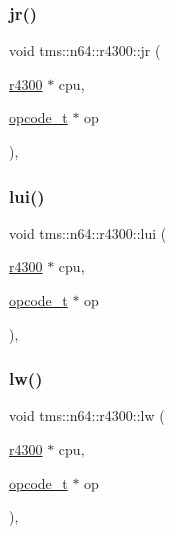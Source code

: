 \subsubsection{\texorpdfstring{jr()}{jr()}}
{\footnotesize\ttfamily void tms\+::n64\+::r4300\+::jr (\begin{DoxyParamCaption}\item[{\hyperlink{classtms_1_1n64_1_1r4300}{r4300} $\ast$}]{cpu,  }\item[{\hyperlink{classtms_1_1n64_1_1opcode__t}{opcode\+\_\+t} $\ast$}]{op }\end{DoxyParamCaption})\hspace{0.3cm}{\ttfamily [static]}, {\ttfamily [private]}}

\mbox{\label{classtms_1_1n64_1_1r4300_aabb49fbdff80873de9b192d0c9034bb0}} 
\subsubsection{\texorpdfstring{lui()}{lui()}}
{\footnotesize\ttfamily void tms\+::n64\+::r4300\+::lui (\begin{DoxyParamCaption}\item[{\hyperlink{classtms_1_1n64_1_1r4300}{r4300} $\ast$}]{cpu,  }\item[{\hyperlink{classtms_1_1n64_1_1opcode__t}{opcode\+\_\+t} $\ast$}]{op }\end{DoxyParamCaption})\hspace{0.3cm}{\ttfamily [static]}, {\ttfamily [private]}}

\mbox{\label{classtms_1_1n64_1_1r4300_ae39fc447e3405aa3d4c0ab8a371dd192}} 
\subsubsection{\texorpdfstring{lw()}{lw()}}
{\footnotesize\ttfamily void tms\+::n64\+::r4300\+::lw (\begin{DoxyParamCaption}\item[{\hyperlink{classtms_1_1n64_1_1r4300}{r4300} $\ast$}]{cpu,  }\item[{\hyperlink{classtms_1_1n64_1_1opcode__t}{opcode\+\_\+t} $\ast$}]{op }\end{DoxyParamCaption})\hspace{0.3cm}{\ttfamily [static]}, {\ttfamily [private]}}

